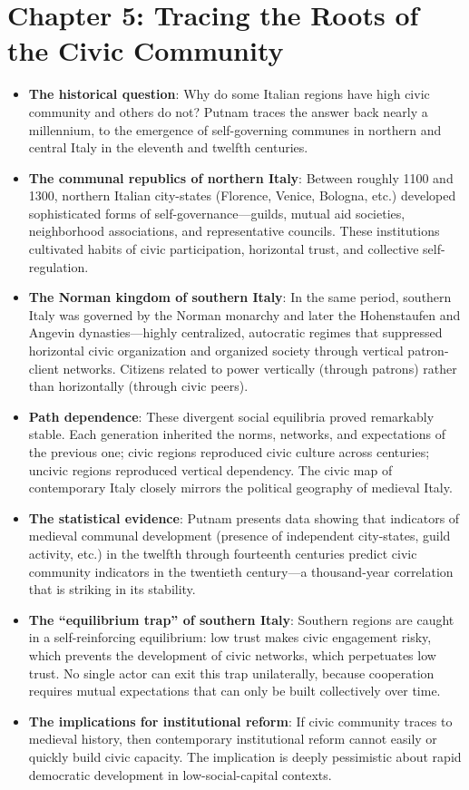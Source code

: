 \documentclass[12pt]{article}
\begin{document}
\section{Chapter 5: Tracing the Roots of the Civic Community}

\begin{itemize}[leftmargin=*, itemsep=4pt]
    \item \textbf{The historical question}: Why do some Italian regions have high civic community and others do not? Putnam traces the answer back nearly a millennium, to the emergence of self-governing communes in northern and central Italy in the eleventh and twelfth centuries.
    \item \textbf{The communal republics of northern Italy}: Between roughly 1100 and 1300, northern Italian city-states (Florence, Venice, Bologna, etc.) developed sophisticated forms of self-governance---guilds, mutual aid societies, neighborhood associations, and representative councils. These institutions cultivated habits of civic participation, horizontal trust, and collective self-regulation.
    \item \textbf{The Norman kingdom of southern Italy}: In the same period, southern Italy was governed by the Norman monarchy and later the Hohenstaufen and Angevin dynasties---highly centralized, autocratic regimes that suppressed horizontal civic organization and organized society through vertical patron-client networks. Citizens related to power vertically (through patrons) rather than horizontally (through civic peers).
    \item \textbf{Path dependence}: These divergent social equilibria proved remarkably stable. Each generation inherited the norms, networks, and expectations of the previous one; civic regions reproduced civic culture across centuries; uncivic regions reproduced vertical dependency. The civic map of contemporary Italy closely mirrors the political geography of medieval Italy.
    \item \textbf{The statistical evidence}: Putnam presents data showing that indicators of medieval communal development (presence of independent city-states, guild activity, etc.) in the twelfth through fourteenth centuries predict civic community indicators in the twentieth century---a thousand-year correlation that is striking in its stability.
    \item \textbf{The ``equilibrium trap'' of southern Italy}: Southern regions are caught in a self-reinforcing equilibrium: low trust makes civic engagement risky, which prevents the development of civic networks, which perpetuates low trust. No single actor can exit this trap unilaterally, because cooperation requires mutual expectations that can only be built collectively over time.
    \item \textbf{The implications for institutional reform}: If civic community traces to medieval history, then contemporary institutional reform cannot easily or quickly build civic capacity. The implication is deeply pessimistic about rapid democratic development in low-social-capital contexts.
\end{itemize}
\end{document}

